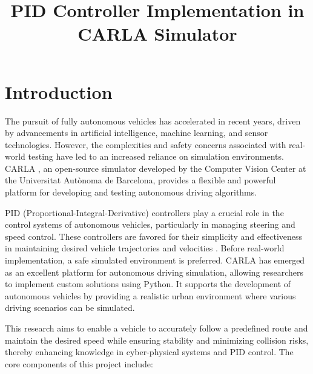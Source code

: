 \documentclass[conference]{IEEEtran}
\begin{document}
\title{PID Controller Implementation in CARLA Simulator}

\author{
}

\maketitle

\section{Introduction}

The pursuit of fully autonomous vehicles has accelerated in recent years, driven by advancements in artificial intelligence, machine learning, and sensor technologies. However, the complexities and safety concerns associated with real-world testing have led to an increased reliance on simulation environments. CARLA \cite{dosovitskiy2017carla}, an open-source simulator developed by the Computer Vision Center at the Universitat Autònoma de Barcelona, provides a flexible and powerful platform for developing and testing autonomous driving algorithms.

PID (Proportional-Integral-Derivative) controllers play a crucial role in the control systems of autonomous vehicles, particularly in managing steering and speed control. These controllers are favored for their simplicity and effectiveness in maintaining desired vehicle trajectories and velocities \cite{10.1108/ir-12-2019-0254}. Before real-world implementation, a safe simulated environment is preferred. CARLA has emerged as an excellent platform for autonomous driving simulation, allowing researchers to implement custom solutions using Python. It supports the development of autonomous vehicles by providing a realistic urban environment where various driving scenarios can be simulated.

This research aims to enable a vehicle to accurately follow a predefined route and maintain the desired speed while ensuring stability and minimizing collision risks, thereby enhancing knowledge in cyber-physical systems and PID control. The core components of this project include:
\end{document}

